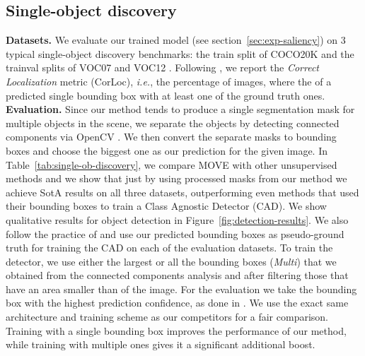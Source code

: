\documentclass{article}
\newcommand\ie{\emph{i.e.}}
\newcommand\methodname{MOVE\xspace}
\begin{document}
\subsection{Single-object discovery}

\textbf{Datasets.} We evaluate our trained model (see section~\ref{sec:exp-saliency}) on 3 typical single-object discovery benchmarks: the train split of COCO20K \cite{lin2014microsoft,vo2020toward} and the trainval splits of VOC07 \cite{pascal-voc-2007} and VOC12 \cite{pascal-voc-2012}. Following \cite{cho2015unsupervised,deselaers2010localizing,siva2013looking,vo2019unsupervised,vo2020toward,vo2021large,LOST,wang2022self}, we report the \textit{Correct Localization} metric (CorLoc), \ie, the percentage of images, where the  of a predicted single bounding box with at least one of the ground truth ones.\\
\noindent\textbf{Evaluation.} Since our method tends to produce a single segmentation mask for multiple objects in the scene, we separate the objects by detecting connected components via OpenCV \cite{opencv_library}. We then convert the separate masks to bounding boxes and choose the biggest one as our prediction for the given image. In Table~\ref{tab:single-ob-discovery}, we compare \methodname with other unsupervised methods and we show that just by using processed masks from our method we achieve SotA results on all three datasets, outperforming even methods that used their bounding boxes to train a Class Agnostic Detector (CAD). We show qualitative results for object detection in Figure~\ref{fig:detection-results}.
We also follow the practice of \cite{LOST,wang2022self} and use our predicted  bounding boxes as pseudo-ground truth for training the CAD on each of the evaluation datasets. To train the detector, we use either the largest or all the bounding boxes (\textit{Multi}) that we obtained from the connected components analysis and after filtering those that have an area smaller than  of the image. For the evaluation we take the bounding box with the highest prediction confidence, as done in \cite{LOST,wang2022self}. We use the exact same architecture and training scheme as our competitors for a fair comparison. Training with a single bounding box improves the performance of our method, while training with multiple ones gives it a significant additional boost.\\
\end{document}
